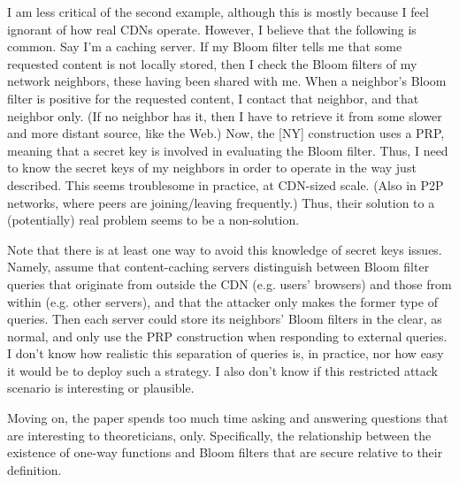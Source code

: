  

I am less critical of the second example, although this is mostly because I feel ignorant of how real CDNs operate.  However, I believe that the following is common.  Say I'm a caching server.  If my Bloom filter tells me that some requested content is not locally stored, then I check the Bloom filters of my network neighbors, these having been shared with me.  When a neighbor's Bloom filter is positive for the requested content, I contact that neighbor, and that neighbor only.  (If no neighbor has it, then I have to retrieve it from some slower and more distant source, like the Web.)  Now, the [NY] construction uses a PRP, meaning that a secret key is involved in evaluating the Bloom filter.  Thus, I need to know the secret keys of my neighbors in order to operate in the way just described.  This seems troublesome in practice, at CDN-sized scale. (Also in P2P networks, where peers are joining/leaving frequently.)  Thus, their solution to a (potentially) real problem seems to be a non-solution.

Note that there is at least one way to avoid this knowledge of secret keys issues.  Namely, assume that content-caching servers distinguish between Bloom filter queries that originate from outside the CDN (e.g. users’ browsers) and those from within (e.g. other servers), and that the attacker only makes the former type of queries.  Then each server could store its neighbors’ Bloom filters in the clear, as normal, and only use the PRP construction when responding to external queries.  I don’t know how realistic this separation of queries is, in practice, nor how easy it would be to deploy such a strategy.  I also don’t know if this restricted attack scenario is interesting or plausible.

Moving on, the paper spends too much time asking and answering questions that are interesting to theoreticians, only.  Specifically, the relationship between the existence of one-way functions and Bloom filters that are secure relative to their definition.

